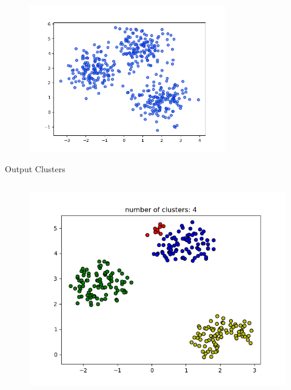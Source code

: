 \documentclass[12pt]{article}
\renewcommand{\_}{\kern-1.5pt\textunderscore\kern-1.5pt}
\begin{document}
\begin{figure}[H]
	\begin{Center}
		\includegraphics[width=3.37in,height=2.52in]{./media/image6.png}
	\end{Center}
\end{figure}



\par


\vspace{\baselineskip}

\vspace{\baselineskip}
Output Clusters\par




\begin{figure}[H]
	\begin{Center}
		\includegraphics[width=4.83in,height=3.62in]{./media/image7.png}
	\end{Center}
\end{figure}
\end{document}
